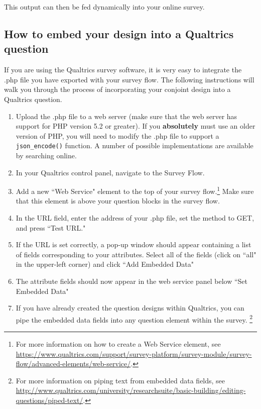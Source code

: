 \documentclass[12pt]{article}
\begin{document}
This output can then be fed dynamically into your online survey.

\subsection{How to embed your design into a Qualtrics question}

If you are using the Qualtrics survey software, it is very easy to integrate the .php file you have exported with your survey flow. The following instructions will walk you through the process of incorporating your conjoint design into a Qualtrics question.
\begin{enumerate}
\item Upload the .php file to a web server (make sure that the web server has support for PHP version 5.2 or greater). If you \textbf{absolutely} must use an older version of PHP, you will need to modify the .php file to support a \texttt{json\_encode()} function. A number of possible implementations are available by searching online. 
\item In your Qualtrics control panel, navigate to the Survey Flow.
\item Add a new ``Web Service" element to the top of your survey flow.\footnote{For more information on how to create a Web Service element, see \href{https://www.qualtrics.com/support/survey-platform/survey-module/survey-flow/advanced-elements/web-service/}{https://www.qualtrics.com/support/survey-platform/survey-module/survey-flow/advanced-elements/web-service/}.} Make sure that this element is above your question blocks in the survey flow.
\item In the URL field, enter the address of your .php file, set the method to GET, and press ``Test URL."  
\item If the URL is set correctly, a pop-up window should appear containing a list of fields corresponding to your attributes. Select all of the fields (click on ``all" in the upper-left corner) and click ``Add Embedded Data"
\item The attribute fields should now appear in the web service panel below ``Set Embedded Data"
\item If you have already created the question designs within Qualtrics, you can pipe the embedded data fields into any question element within the survey. \footnote{For more information on piping text from embedded data fields, see \href{http://www.qualtrics.com/university/researchsuite/basic-building/editing-questions/piped-text/}{http://www.qualtrics.com/university/researchsuite/basic-building/editing-questions/piped-text/}.} 

\end{enumerate}
\end{document}
